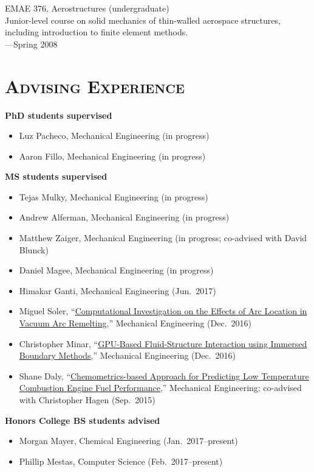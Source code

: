 \documentclass[margin,line,11pt]{res}
\begin{document}
\begin{resume}
EMAE 376, Aerostructures (undergraduate) \\
Junior-level course on solid mechanics of thin-walled aerospace structures, including introduction to finite element methods. \\
---Spring 2008

\section{\textsc{Advising Experience}}

\textbf{PhD students supervised}
\begin{itemize}[leftmargin=*]
    \item Luz Pacheco, Mechanical Engineering (in progress)
    \item Aaron Fillo, Mechanical Engineering (in progress)
\end{itemize}

\textbf{MS students supervised}
\begin{itemize}[leftmargin=*]
    \item Tejas Mulky, Mechanical Engineering (in progress)
    \item Andrew Alferman, Mechanical Engineering (in progress)
    \item Matthew Zaiger, Mechanical Engineering (in progress; co-advised with David Blunck)
    \item Daniel Magee, Mechanical Engineering (in progress)
    \item Himakar Ganti, Mechanical Engineering (Jun.~2017)
    \item Miguel Soler, ``\href{http://hdl.handle.net/1957/60070}{Computational Investigation on the Effects of Arc Location in Vacuum Arc Remelting},'' Mechanical Engineering (Dec.\ 2016)
    \item Christopher Minar, ``\href{http://hdl.handle.net/1957/60147}{GPU-Based Fluid-Structure Interaction using Immersed Boundary Methods},'' Mechanical Engineering (Dec.\ 2016)
    \item Shane Daly, ``\href{http://hdl.handle.net/1957/57465}{Chemometrics-based Approach for Predicting Low Temperature Combustion Engine Fuel Performance},'' Mechanical Engineering; co-advised with Christopher Hagen (Sep.\ 2015)
\end{itemize}

\textbf{Honors College BS students advised}
\begin{itemize}[leftmargin=*]
    \item Morgan Mayer, Chemical Engineering (Jan.~2017--present)
    \item Phillip Mestas, Computer Science (Feb.~2017--present)
\end{itemize}


\end{resume}
\end{document}
